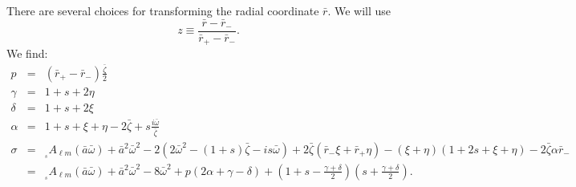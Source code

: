 \documentclass[11pt]{article}
\newcommand{\scA}[4][]{{}_{{}_{#2}}A^{#1}_{#3}(#4)}
\begin{document}
There are several choices for transforming the radial coordinate
$\bar{r}$.  We will use
\begin{equation}
z \equiv \frac{\bar{r}-\bar{r}_\minus}{\bar{r}_+-\bar{r}_\minus}.
\end{equation}
We find:
\begin{eqnarray}
  p &=& (\bar{r}_+-\bar{r}_\minus)\frac{\bar\zeta}2 \\
  \gamma &=& 1+s+2\eta \\
  \delta &=& 1+s+2\xi \\
  \alpha &=& 1+s+\xi+\eta - 2\bar\zeta + s\frac{i\bar\omega}{\bar\zeta} \\
  \sigma &=& \scA{s}{\ell{m}}{\bar{a}\bar\omega} + \bar{a}^2\bar\omega^2 
   - 2\left(2\bar\omega^2-(1+s)\bar\zeta-is\bar\omega\right) 
   + 2\bar\zeta(\bar{r}_\minus\xi + \bar{r}_+\eta) - (\xi+\eta) (1+2s+\xi+\eta)
   -2\bar\zeta\alpha\bar{r}_\minus \nonumber\\
   &=& \scA{s}{\ell{m}}{\bar{a}\bar\omega} + \bar{a}^2\bar\omega^2 
   - 8\bar\omega^2 + p(2\alpha+\gamma-\delta)
   + \left(1+s-\frac{\gamma+\delta}2\right)\left(s+\frac{\gamma+\delta}2\right).
\end{eqnarray}
\end{document}

